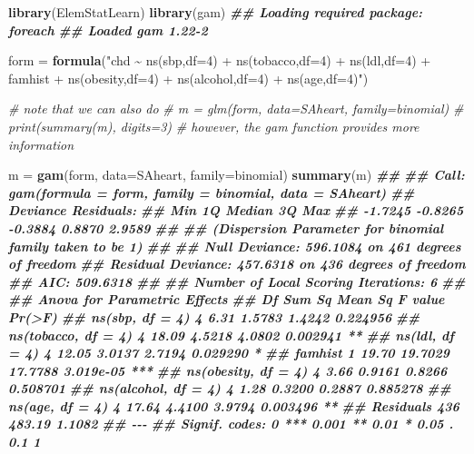 \documentclass[
]{book}
\newenvironment{Shaded}{\begin{snugshade}}{\end{snugshade}}
\newcommand{\AttributeTok}[1]{\textcolor[rgb]{0.13,0.29,0.53}{#1}}
\newcommand{\CommentTok}[1]{\textcolor[rgb]{0.56,0.35,0.01}{\textit{#1}}}
\newcommand{\DocumentationTok}[1]{\textcolor[rgb]{0.56,0.35,0.01}{\textbf{\textit{#1}}}}
\newcommand{\FunctionTok}[1]{\textcolor[rgb]{0.13,0.29,0.53}{\textbf{#1}}}
\newcommand{\NormalTok}[1]{#1}
\newcommand{\OtherTok}[1]{\textcolor[rgb]{0.56,0.35,0.01}{#1}}
\newcommand{\StringTok}[1]{\textcolor[rgb]{0.31,0.60,0.02}{#1}}
\theoremstyle{definition}
\theoremstyle{definition}
\theoremstyle{definition}
\theoremstyle{definition}
\theoremstyle{remark}
\begin{document}
\begin{Shaded}
\begin{Highlighting}[]
    \FunctionTok{library}\NormalTok{(ElemStatLearn)}
    \FunctionTok{library}\NormalTok{(gam)}
\DocumentationTok{\#\# Loading required package: foreach}
\DocumentationTok{\#\# Loaded gam 1.22{-}2}

\NormalTok{    form }\OtherTok{=} \FunctionTok{formula}\NormalTok{(}\StringTok{"chd \textasciitilde{} ns(sbp,df=4) + ns(tobacco,df=4) + }
\StringTok{                          ns(ldl,df=4) + famhist + ns(obesity,df=4) + }
\StringTok{                          ns(alcohol,df=4) + ns(age,df=4)"}\NormalTok{)}
    
    \CommentTok{\# note that we can also do }
    \CommentTok{\# m = glm(form, data=SAheart, family=binomial)}
    \CommentTok{\# print(summary(m), digits=3)}
    \CommentTok{\# however, the gam function provides more information }
    
\NormalTok{    m }\OtherTok{=} \FunctionTok{gam}\NormalTok{(form, }\AttributeTok{data=}\NormalTok{SAheart, }\AttributeTok{family=}\NormalTok{binomial)}
    \FunctionTok{summary}\NormalTok{(m)}
\DocumentationTok{\#\# }
\DocumentationTok{\#\# Call: gam(formula = form, family = binomial, data = SAheart)}
\DocumentationTok{\#\# Deviance Residuals:}
\DocumentationTok{\#\#     Min      1Q  Median      3Q     Max }
\DocumentationTok{\#\# {-}1.7245 {-}0.8265 {-}0.3884  0.8870  2.9589 }
\DocumentationTok{\#\# }
\DocumentationTok{\#\# (Dispersion Parameter for binomial family taken to be 1)}
\DocumentationTok{\#\# }
\DocumentationTok{\#\#     Null Deviance: 596.1084 on 461 degrees of freedom}
\DocumentationTok{\#\# Residual Deviance: 457.6318 on 436 degrees of freedom}
\DocumentationTok{\#\# AIC: 509.6318 }
\DocumentationTok{\#\# }
\DocumentationTok{\#\# Number of Local Scoring Iterations: 6 }
\DocumentationTok{\#\# }
\DocumentationTok{\#\# Anova for Parametric Effects}
\DocumentationTok{\#\#                      Df Sum Sq Mean Sq F value    Pr(\textgreater{}F)    }
\DocumentationTok{\#\# ns(sbp, df = 4)       4   6.31  1.5783  1.4242  0.224956    }
\DocumentationTok{\#\# ns(tobacco, df = 4)   4  18.09  4.5218  4.0802  0.002941 ** }
\DocumentationTok{\#\# ns(ldl, df = 4)       4  12.05  3.0137  2.7194  0.029290 *  }
\DocumentationTok{\#\# famhist               1  19.70 19.7029 17.7788 3.019e{-}05 ***}
\DocumentationTok{\#\# ns(obesity, df = 4)   4   3.66  0.9161  0.8266  0.508701    }
\DocumentationTok{\#\# ns(alcohol, df = 4)   4   1.28  0.3200  0.2887  0.885278    }
\DocumentationTok{\#\# ns(age, df = 4)       4  17.64  4.4100  3.9794  0.003496 ** }
\DocumentationTok{\#\# Residuals           436 483.19  1.1082                      }
\DocumentationTok{\#\# {-}{-}{-}}
\DocumentationTok{\#\# Signif. codes:  0 \textquotesingle{}***\textquotesingle{} 0.001 \textquotesingle{}**\textquotesingle{} 0.01 \textquotesingle{}*\textquotesingle{} 0.05 \textquotesingle{}.\textquotesingle{} 0.1 \textquotesingle{} \textquotesingle{} 1}
    

\end{Highlighting}
\end{Shaded}
\end{document}
